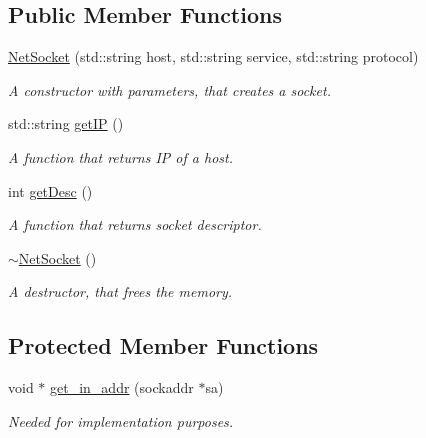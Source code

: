 \subsection*{Public Member Functions}
\begin{DoxyCompactItemize}
\item 
\hyperlink{class_net_socket_p_p_1_1_net_socket_abae69a67be7881bbb2fdf605fdd145e5}{Net\-Socket} (std\-::string host, std\-::string service, std\-::string protocol)
\begin{DoxyCompactList}\small\item\em A constructor with parameters, that creates a socket. \end{DoxyCompactList}\item 
std\-::string \hyperlink{class_net_socket_p_p_1_1_net_socket_a3e44de8e02caba69d0763bf7e42c9972}{get\-I\-P} ()
\begin{DoxyCompactList}\small\item\em A function that returns I\-P of a host. \end{DoxyCompactList}\item 
int \hyperlink{class_net_socket_p_p_1_1_net_socket_a932cf37dd25b45aeb9d07439f3fae5a5}{get\-Desc} ()
\begin{DoxyCompactList}\small\item\em A function that returns socket descriptor. \end{DoxyCompactList}\item 
\hypertarget{class_net_socket_p_p_1_1_net_socket_a3ebe4e1d8db6978255f48e1034d638a4}{\hyperlink{class_net_socket_p_p_1_1_net_socket_a3ebe4e1d8db6978255f48e1034d638a4}{$\sim$\-Net\-Socket} ()}\label{class_net_socket_p_p_1_1_net_socket_a3ebe4e1d8db6978255f48e1034d638a4}

\begin{DoxyCompactList}\small\item\em A destructor, that frees the memory. \end{DoxyCompactList}\end{DoxyCompactItemize}
\subsection*{Protected Member Functions}
\begin{DoxyCompactItemize}
\item 
\hypertarget{class_net_socket_p_p_1_1_net_socket_a240ac4d2e384549b5757a79d0e2146bf}{void $\ast$ \hyperlink{class_net_socket_p_p_1_1_net_socket_a240ac4d2e384549b5757a79d0e2146bf}{get\-\_\-in\-\_\-addr} (sockaddr $\ast$sa)}\label{class_net_socket_p_p_1_1_net_socket_a240ac4d2e384549b5757a79d0e2146bf}

\begin{DoxyCompactList}\small\item\em Needed for implementation purposes. \end{DoxyCompactList}\end{DoxyCompactItemize}
